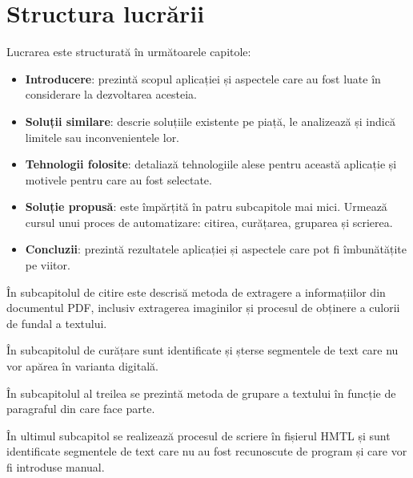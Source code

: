 \section{Structura lucrării}

Lucrarea este structurată în următoarele capitole:
\begin{itemize}
 	\item \textbf{Introducere}: prezintă scopul aplicației și aspectele care au fost luate în considerare la dezvoltarea acesteia.
 	\item \textbf{Soluții similare}: descrie soluțiile existente pe piață, le analizează și indică limitele sau inconvenientele lor.
 	\item \textbf{Tehnologii folosite}: detaliază tehnologiile alese pentru această aplicație și motivele pentru care au fost selectate.
 	\item \textbf{Soluție propusă}: este împărțită în patru subcapitole mai mici. Urmează cursul unui proces de automatizare: citirea, curățarea, gruparea și scrierea. 
	\item \textbf{Concluzii}: prezintă rezultatele aplicației și aspectele care pot fi îmbunătățite pe viitor. 
\end{itemize}

În subcapitolul de citire este descrisă metoda de extragere a informațiilor din documentul PDF, inclusiv extragerea imaginilor și procesul de obținere a culorii de fundal a textului.

În subcapitolul de curățare sunt identificate și șterse segmentele de text care nu vor apărea în varianta digitală.

În subcapitolul al treilea se prezintă metoda de grupare a textului în funcție de paragraful din care face parte.

În ultimul subcapitol se realizează procesul de scriere în fișierul HMTL și sunt identificate segmentele de text care nu au fost recunoscute de program și care vor fi introduse manual.
